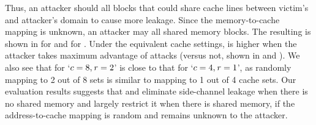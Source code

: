 Thus, an attacker should \flushreload all blocks that could share
cache lines between victim's and attacker's domain to cause more
leakage.  Since the memory-to-cache mapping is unknown, an attacker
may \flushreload all shared memory blocks. The resulting
\JaccardRand{\secretsSetSize} is shown in
 for \scatterCache and
 for . Under the
equivalent cache settings, \JaccardRand{\secretsSetSize} is higher
when the attacker takes maximum advantage of \flushreload attacks
(versus not, shown in  and
).  We also see that
\JaccardRand{\secretsSetSize} for `$c=8,\mathit{r}=2$' is
close to that for `$c=4,\mathit{r}=1$', as randomly mapping
to 2 out of 8 sets is similar to mapping to 1 out of 4 cache sets.
Our evaluation results suggests that \scatterCache and 
eliminate side-channel leakage when there is no shared memory and
largely restrict it when there is shared memory, if the
address-to-cache mapping is random and remains unknown to the
attacker.

